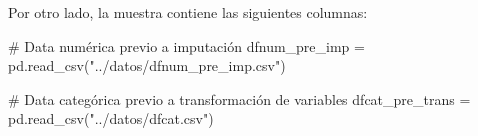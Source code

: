 \documentclass[
  letterpaper,
  DIV=11,
  numbers=noendperiod]{scrartcl}
\newenvironment{Shaded}{\begin{snugshade}}{\end{snugshade}}
\newcommand{\CommentTok}[1]{\textcolor[rgb]{0.38,0.45,0.64}{#1}}
\newcommand{\FunctionTok}[1]{\textcolor[rgb]{0.31,0.98,0.48}{#1}}
\newcommand{\NormalTok}[1]{\textcolor[rgb]{0.97,0.97,0.95}{#1}}
\newcommand{\OperatorTok}[1]{\textcolor[rgb]{0.97,0.97,0.95}{#1}}
\newcommand{\SpecialCharTok}[1]{\textcolor[rgb]{1.00,0.47,0.78}{#1}}
\newcommand{\StringTok}[1]{\textcolor[rgb]{0.95,0.98,0.55}{#1}}
\begin{document}
Por otro lado, la muestra contiene las siguientes columnas:

\begin{Shaded}
\begin{Highlighting}[]
\CommentTok{\# Data numérica previo a imputación}
\NormalTok{dfnum\_pre\_imp }\OperatorTok{=}\NormalTok{ pd.read\_csv(}\StringTok{"../datos/dfnum\_pre\_imp.csv"}\NormalTok{)}

\CommentTok{\# Data categórica previo a transformación de variables}
\NormalTok{dfcat\_pre\_trans }\OperatorTok{=}\NormalTok{ pd.read\_csv(}\StringTok{"../datos/dfcat.csv"}\NormalTok{)}
\end{Highlighting}
\end{Shaded}

\begin{Shaded}
\end{Shaded}
\end{document}
